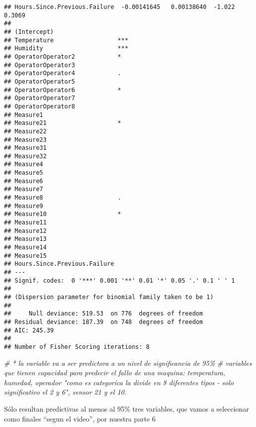 \documentclass[
]{article}
\newenvironment{Shaded}{\begin{snugshade}}{\end{snugshade}}
\newcommand{\CommentTok}[1]{\textcolor[rgb]{0.56,0.35,0.01}{\textit{#1}}}
\begin{document}
\begin{verbatim}
## Hours.Since.Previous.Failure  -0.00141645   0.00138640  -1.022        0.3069
##                                 
## (Intercept)                     
## Temperature                  ***
## Humidity                     ***
## OperatorOperator2            *  
## OperatorOperator3               
## OperatorOperator4            .  
## OperatorOperator5               
## OperatorOperator6            *  
## OperatorOperator7               
## OperatorOperator8               
## Measure1                        
## Measure21                    *  
## Measure22                       
## Measure23                       
## Measure31                       
## Measure32                       
## Measure4                        
## Measure5                        
## Measure6                        
## Measure7                        
## Measure8                     .  
## Measure9                        
## Measure10                    *  
## Measure11                       
## Measure12                       
## Measure13                       
## Measure14                       
## Measure15                       
## Hours.Since.Previous.Failure    
## ---
## Signif. codes:  0 '***' 0.001 '**' 0.01 '*' 0.05 '.' 0.1 ' ' 1
## 
## (Dispersion parameter for binomial family taken to be 1)
## 
##     Null deviance: 519.53  on 776  degrees of freedom
## Residual deviance: 187.39  on 748  degrees of freedom
## AIC: 245.39
## 
## Number of Fisher Scoring iterations: 8
\end{verbatim}

\begin{Shaded}
\begin{Highlighting}[]
\CommentTok{\# * la variable va a ser predictora a un nivel de significancia de 95\%}
\CommentTok{\# variables que tienen capacidad para predecir el fallo de una maquina: temperatura, humedad, operador "como es categorica la divide en 8 diferentes tipos {-} solo significativo el 2 y 6", sensor 21 y el 10.}
\end{Highlighting}
\end{Shaded}

Sólo resultan predictivas al menos al 95\% tres variables, que vamos a
seleccionar como finales ``segun el video'', por nuestra parte 6
\end{document}
